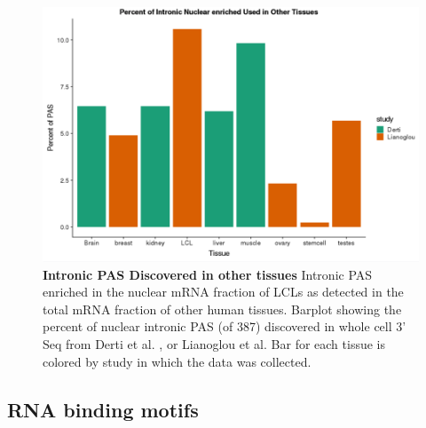 \begin{figure}
\centering \includegraphics[width=5in]{img/ch02/figureAppendix2.png}
\caption[Intronic PAS Discovered in other tissues]{\textbf{Intronic PAS Discovered in other tissues} Intronic PAS enriched in the nuclear mRNA fraction of LCLs as detected in the total mRNA fraction of other human tissues. Barplot showing the percent of nuclear intronic PAS (of 387) discovered in whole cell 3' Seq from Derti et al. \citep{derti_quantitative_2012}, or Lianoglou et al. \citep{lianoglou_ubiquitously_2013}  Bar for each tissue is colored by study in which the data was collected.}
\label{fig:Supplementaryfile1-Fig2}
\end{figure}



\subsection{RNA binding motifs}\label{ch02-RBPs}

